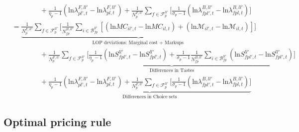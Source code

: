\begin{linenomath*}
\begin{equation*}
\begin{aligned}
            & \qquad \qquad
                +   \frac{1}{\eta_p-1} 
                        \left(\text{ln} \lambda^{F,ll'}_{pl',t} - \text{ln}\lambda^{F,ll'}_{pl,t} \right)
                    + \frac{1}{N^{F,ll'}_{p}} \sum_{f \in \mathcal{F}^{ll'}_{p}} 
                    \Bigg[
                        \frac{1}{\sigma_p-1} 
                        \left(\text{ln} \lambda^{B,ll'}_{fpl',t} - \text{ln}\lambda^{B,ll'}_{fpl,t} \right)  
                    \Bigg] \\
            &=  \underbrace{\frac{1}{N^{F,ll'}_{p}} \sum_{f \in \mathcal{F}^{ll'}_{p}} 
                    \Bigg[
                        \frac{1}{N^{B,ll'}_{fp}} \sum_{i \in \mathcal{B}^{ll'}_{fp}} 
                        \left[
                            \left(\text{ln}MC_{il',t} - \text{ln}MC_{il,t}\right) +
                            \left(\text{ln}\mathcal{M}_{il',t} - \text{ln}\mathcal{M}_{il,t}\right)
                        \right]
                    \Bigg]}_{\text{LOP deviations: Marginal cost + Markups }} \\
                & \qquad \qquad
                    +   \underbrace{\frac{1}{N^{F,ll'}_{p}} \sum_{f \in \mathcal{F}^{ll'}_{p}}
                        \Bigg[ 
                            \frac{1}{\eta_p-1} 
                            \left(\text{ln}S^{ll'}_{fpl',t} - \text{ln}S^{ll'}_{fpl',t} \right)
                            + \frac{1}{\sigma_p-1} 
                            \frac{1}{N^{B,ll'}_{fp}} \sum_{i \in \mathcal{B}^{ll'}_{fp}} 
                            \left(\text{ln}S^{ll'}_{fpl',t} - \text{ln}S^{ll'}_{fpl',t} \right)
                        \Bigg]}_{\text{Differences in Tastes}} \\
                & \qquad \qquad
                    +   \underbrace{
                        \frac{1}{\eta_p-1} 
                            \left(\text{ln} \lambda^{F,ll'}_{pl',t} - \text{ln}\lambda^{F,ll'}_{pl,t} \right)
                        + \frac{1}{N^{F,ll'}_{p}} \sum_{f \in \mathcal{F}^{ll'}_{p}} 
                        \Bigg[
                            \frac{1}{\sigma_p-1} 
                            \left(\text{ln} \lambda^{B,ll'}_{fpl',t} - \text{ln}\lambda^{B,ll'}_{fpl,t} \right)  
                        \Bigg]}_{\text{Differences in Choice sets}}    
    \end{aligned}
\end{equation*}
\end{linenomath*}

\subsection{Optimal pricing rule}

